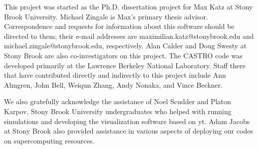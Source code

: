\documentclass[12pt]{book}
\begin{document}
This project was started as the Ph.D. dissertation project for Max Katz at Stony Brook University. 
Michael Zingale is Max's primary thesis advisor. Correspondence and requests for information 
about this software should be directed to them; their e-mail addresses are maximilian.katz@stonybrook.edu
and michael.zingale@stonybrook.edu, respectively. Alan Calder and Doug Swesty at Stony Brook are 
also co-investigators on this project. The CASTRO code was developed primarily at the 
Lawrence Berkeley National Laboratory. Staff there that have contributed directly and 
indirectly to this project include Ann Almgren, John Bell, Weiqun Zhang, Andy Nonaka, and Vince Beckner.

We also gratefully acknowledge the assistance of Noel Scudder and Platon Karpov, 
Stony Brook University undergraduates who helped with running simulations and 
developing the visualization software based on yt. Adam Jacobs at Stony Brook also provided 
assistance in various aspects of deploying our codes on supercomputing resources.

\backmatter



\end{document}
